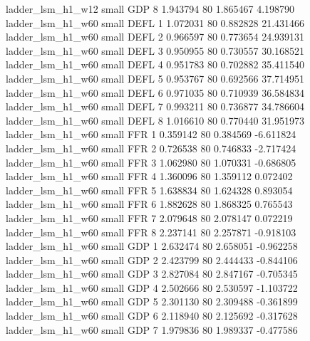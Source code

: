        ladder_lsm_h1_w12      small      GDP                 8 1.943794 80       1.865467           4.198790
       ladder_lsm_h1_w60      small     DEFL                 1 1.072031 80       0.882828          21.431466
       ladder_lsm_h1_w60      small     DEFL                 2 0.966597 80       0.773654          24.939131
       ladder_lsm_h1_w60      small     DEFL                 3 0.950955 80       0.730557          30.168521
       ladder_lsm_h1_w60      small     DEFL                 4 0.951783 80       0.702882          35.411540
       ladder_lsm_h1_w60      small     DEFL                 5 0.953767 80       0.692566          37.714951
       ladder_lsm_h1_w60      small     DEFL                 6 0.971035 80       0.710939          36.584834
       ladder_lsm_h1_w60      small     DEFL                 7 0.993211 80       0.736877          34.786604
       ladder_lsm_h1_w60      small     DEFL                 8 1.016610 80       0.770440          31.951973
       ladder_lsm_h1_w60      small      FFR                 1 0.359142 80       0.384569          -6.611824
       ladder_lsm_h1_w60      small      FFR                 2 0.726538 80       0.746833          -2.717424
       ladder_lsm_h1_w60      small      FFR                 3 1.062980 80       1.070331          -0.686805
       ladder_lsm_h1_w60      small      FFR                 4 1.360096 80       1.359112           0.072402
       ladder_lsm_h1_w60      small      FFR                 5 1.638834 80       1.624328           0.893054
       ladder_lsm_h1_w60      small      FFR                 6 1.882628 80       1.868325           0.765543
       ladder_lsm_h1_w60      small      FFR                 7 2.079648 80       2.078147           0.072219
       ladder_lsm_h1_w60      small      FFR                 8 2.237141 80       2.257871          -0.918103
       ladder_lsm_h1_w60      small      GDP                 1 2.632474 80       2.658051          -0.962258
       ladder_lsm_h1_w60      small      GDP                 2 2.423799 80       2.444433          -0.844106
       ladder_lsm_h1_w60      small      GDP                 3 2.827084 80       2.847167          -0.705345
       ladder_lsm_h1_w60      small      GDP                 4 2.502666 80       2.530597          -1.103722
       ladder_lsm_h1_w60      small      GDP                 5 2.301130 80       2.309488          -0.361899
       ladder_lsm_h1_w60      small      GDP                 6 2.118940 80       2.125692          -0.317628
       ladder_lsm_h1_w60      small      GDP                 7 1.979836 80       1.989337          -0.477586
